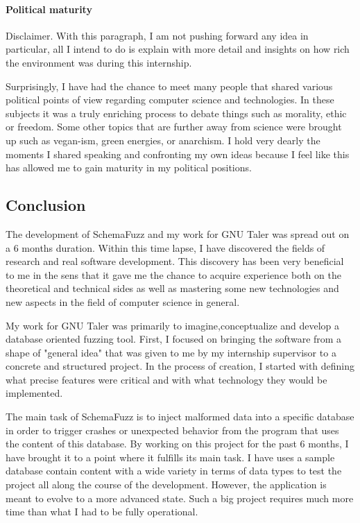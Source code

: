 			\paragraph{Political maturity}
Disclaimer. With this paragraph, I am not pushing forward any idea in particular, all I intend to do is explain with more detail and insights on how rich the environment was during this internship.			
			
Surprisingly, I have had the chance to meet many people that shared various political points of view regarding computer science and technologies. In these subjects it was a truly enriching process to debate things such as morality, ethic or freedom.
Some other topics that are further away from science were brought up such as vegan-ism, green energies, or anarchism.
I hold very dearly the moments I shared speaking and confronting my own ideas because I feel like this has allowed me to gain maturity in my political positions.		
	
	\clearpage

	\subsection{Conclusion}
   
The development of SchemaFuzz and my work for GNU Taler was spread out on a 6 months duration.
Within this time lapse, I have discovered the fields of research and real software development.
This discovery has been very beneficial to me in the sens that it gave me the chance to acquire experience both on the theoretical and technical sides as well as mastering some new technologies and new aspects in the field of computer science in general.

My work for GNU Taler was primarily to imagine,conceptualize and develop a database oriented fuzzing tool. 
First, I focused on bringing the software from a shape of "general idea" that was given to me by my internship supervisor to a concrete and structured project. In the process of creation, I started with defining what precise features were critical and with what technology they would be implemented.

The main task of SchemaFuzz is to inject malformed data into a specific database in order to trigger crashes or unexpected behavior from the program that uses the content of this database.
By working on this project for the past 6 months, I have brought it to a point where it fulfills its main task. I have uses a sample database contain content with a wide variety in terms of data types to test the project all along the course of the development. However, the application is meant to evolve to a more advanced state. Such a big project requires much more time than what I had to be fully operational.

